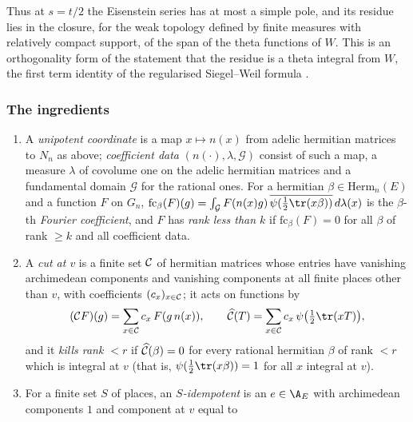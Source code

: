 Thus at $s=t/2$ the Eisenstein series has at most a simple pole, and its residue lies in the closure, for the weak
topology defined by finite measures with relatively compact support, of the span of the theta functions of $W$. This
is an orthogonality form of the statement that the residue is a theta integral from $W$, the first term identity of
the regularised Siegel--Weil formula \cite{KudlaRallis1994,Ichino2004}.

\subsubsection{The ingredients}\label{sec:pf:liftinj:ingr}

\begin{definition}\label{pf:liftinj:cutdef}
\begin{enumerate}[label=(\alph*)]
\item A \emph{unipotent coordinate} is a map $x\mapsto n(x)$ from adelic hermitian matrices to $N_n$ as above; \emph{coefficient data}
$(n(\cdot),\lambda,\mathcal G)$ consist of such a map, a measure $\lambda$ of covolume one on the adelic hermitian matrices and a fundamental
domain $\mathcal G$ for the rational ones. For a hermitian $\beta\in\mathrm{Herm}_n(E)$ and a function $F$ on $G_n$,
$\mathrm{fc}_\beta(F)(g)=\int_{\mathcal G}F(n(x)g)\,\overline{\psi(\frac12\tr(x\beta))}\,d\lambda(x)$ is the $\beta$-th \emph{Fourier coefficient},
and $F$ has \emph{rank less than $k$} if $\mathrm{fc}_\beta(F)=0$ for all $\beta$ of rank $\ge k$ and all coefficient data.
\item A \emph{cut at $v$} is a finite set $\mathcal{C}$ of hermitian matrices whose entries have vanishing archimedean components and vanishing
components at all finite places other than $v$, with coefficients $(c_x)_{x\in\mathcal{C}}$; it acts on functions by
\begin{equation}\label{eq:pf:liftinj:cut}
(\liftinjcut F)(g)=\sum_{x\in\liftinjcut}c_x\,F(g\,n(x)),\qquad \widehat{\liftinjcut}(T)=\sum_{x\in\liftinjcut}c_x\,\psi\bigl(\tfrac12\tr(xT)\bigr),
\end{equation}
and it \emph{kills rank $<r$} if $\widehat{\mathcal{C}}(\beta)=0$ for every rational hermitian $\beta$ of rank $<r$ which is integral at $v$
(that is, $\psi(\frac12\tr(x\beta))=1$ for all $x$ integral at $v$).
\item For a finite set $S$ of places, an \emph{$S$-idempotent} is an $e\in\A_E$ with archimedean components $1$ and component at $v$ equal to

\end{enumerate}
\end{definition}
